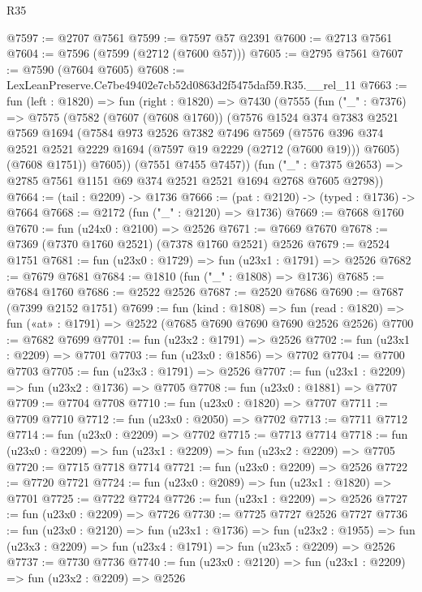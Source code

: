 \begin{lexlean}{R35}
\begin{coremodule}
@7597 := @2707 @7561
@7599 := @7597 @57 @2391
@7600 := @2713 @7561
@7604 := @7596 (@7599 (@2712 (@7600 @57)))
@7605 := @2795 @7561
@7607 := @7590 (@7604 @7605)
@7608 := LexLeanPreserve.Ce7be49402e7cb52d0863d2f5475daf59.R35.__rel_11
@7663 := fun (left : @1820) =>
  fun (right : @1820) =>
  @7430
    (@7555
      (fun ("_" : @7376) =>
      @7575
        (@7582
          (@7607 (@7608 @1760))
          (@7576
            @1524
            @374
            @7383
            @2521
            @7569
            @1694
            (@7584
              @973
              @2526
              @7382
              @7496
              @7569
              (@7576 @396 @374 @2521 @2521 @2229 @1694 (@7597 @19 @2229 (@2712 (@7600 @19))) @7605)
              (@7608 @1751))
            @7605))
        (@7551 @7455 @7457))
      (fun ("_" : @7375 @2653) => @2785 @7561 @1151 @69 @374 @2521 @2521 @1694 @2768 @7605 @2798))
@7664 := (tail : @2209) -> @1736
@7666 := (pat : @2120) -> (typed : @1736) -> @7664
@7668 := @2172 (fun ("_" : @2120) => @1736)
@7669 := @7668 @1760
@7670 := fun (u24x0 : @2100) => @2526
@7671 := @7669 @7670
@7678 := @7369 (@7370 @1760 @2521) (@7378 @1760 @2521) @2526
@7679 := @2524 @1751
@7681 := fun (u23x0 : @1729) => fun (u23x1 : @1791) => @2526
@7682 := @7679 @7681
@7684 := @1810 (fun ("_" : @1808) => @1736)
@7685 := @7684 @1760
@7686 := @2522 @2526
@7687 := @2520 @7686
@7690 := @7687 (@7399 @2152 @1751)
@7699 := fun (kind : @1808) =>
  fun (read : @1820) => fun («at» : @1791) => @2522 (@7685 @7690 @7690 @7690 @2526 @2526)
@7700 := @7682 @7699
@7701 := fun (u23x2 : @1791) => @2526
@7702 := fun (u23x1 : @2209) => @7701
@7703 := fun (u23x0 : @1856) => @7702
@7704 := @7700 @7703
@7705 := fun (u23x3 : @1791) => @2526
@7707 := fun (u23x1 : @2209) => fun (u23x2 : @1736) => @7705
@7708 := fun (u23x0 : @1881) => @7707
@7709 := @7704 @7708
@7710 := fun (u23x0 : @1820) => @7707
@7711 := @7709 @7710
@7712 := fun (u23x0 : @2050) => @7702
@7713 := @7711 @7712
@7714 := fun (u23x0 : @2209) => @7702
@7715 := @7713 @7714
@7718 := fun (u23x0 : @2209) => fun (u23x1 : @2209) => fun (u23x2 : @2209) => @7705
@7720 := @7715 @7718 @7714
@7721 := fun (u23x0 : @2209) => @2526
@7722 := @7720 @7721
@7724 := fun (u23x0 : @2089) => fun (u23x1 : @1820) => @7701
@7725 := @7722 @7724
@7726 := fun (u23x1 : @2209) => @2526
@7727 := fun (u23x0 : @2209) => @7726
@7730 := @7725 @7727 @2526 @7727
@7736 := fun (u23x0 : @2120) =>
  fun (u23x1 : @1736) =>
  fun (u23x2 : @1955) => fun (u23x3 : @2209) => fun (u23x4 : @1791) => fun (u23x5 : @2209) => @2526
@7737 := @7730 @7736
@7740 := fun (u23x0 : @2120) => fun (u23x1 : @2209) => fun (u23x2 : @2209) => @2526

\end{coremodule}
\end{lexlean}
